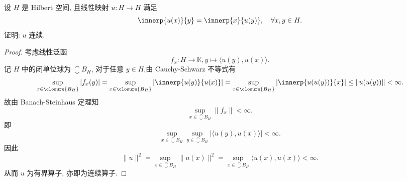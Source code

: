 \begin{exercise}
    设 $H$ 是 Hilbert 空间, 且线性映射 $u:H\to H$ 满足
    \[\innerp{u(x)}{y}=\innerp{x}{u(y)},\quad\forall x,y\in H.\]
    证明: $u$ 连续.
\end{exercise}

\begin{proof}
    考虑线性泛函
    \[f_x:H\to\mathbb{K},y\mapsto\langle u(y),u(x)\rangle.\]
    记 $H$ 中的闭单位球为 $\closure{B_H}$, 对于任意 $y\in H$,由 Cauchy-Schwarz 不等式有
    \[\sup_{x\in\closure{B_H}}|f_x(y)|=\sup_{x\in\closure{B_H}}|\innerp{u(y)}{u(x)}|=\sup_{x\in \closure{B_H}}|\innerp{u(u(y))}{x}|\leq\|u(u(y))\|<\infty.\]
    故由 Banach-Steinhaus 定理知
    \[\sup_{x\in \closure{B_H}}\|f_x\|<\infty.\]
    即
    \[\sup_{x\in \closure{B_H}}\sup_{y\in \closure{B_H}}|\langle u(y),u(x )\rangle|<\infty.\]
    因此
    \[\|u\|^2=\sup_{x\in\closure{B_H}}\|u(x)\|^2=\sup_{x\in \closure{B_H}}\langle u(x),u(x)\rangle<\infty.\]
    从而 $u$ 为有界算子, 亦即为连续算子.
\end{proof}
